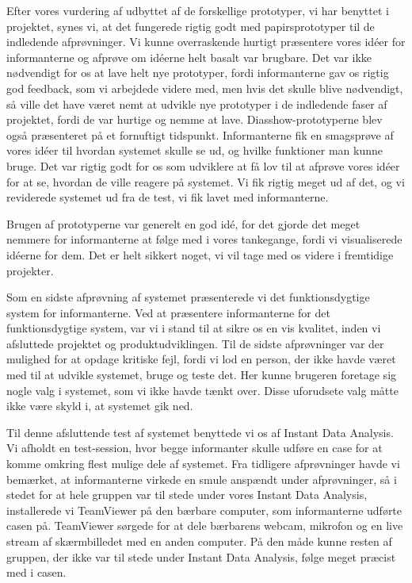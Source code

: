 Efter vores vurdering af udbyttet af de forskellige prototyper, vi har benyttet i projektet, synes vi, at det fungerede rigtig godt med papirsprototyper til de indledende afprøvninger. Vi kunne overraskende hurtigt præsentere vores idéer for informanterne og afprøve om idéerne helt basalt var brugbare. Det var ikke nødvendigt for os at lave helt nye prototyper, fordi informanterne gav os rigtig god feedback, som vi arbejdede videre med, men hvis det skulle blive nødvendigt, så ville det have været nemt at udvikle nye prototyper i de indledende faser af projektet, fordi de var hurtige og nemme at lave. Diasshow-prototyperne blev også præsenteret på et fornuftigt tidspunkt. Informanterne fik en smagsprøve af vores idéer til hvordan systemet skulle se ud, og hvilke funktioner man kunne bruge. Det var rigtig godt for os som udviklere at få lov til at afprøve vores idéer for at se, hvordan de ville reagere på systemet. Vi fik rigtig meget ud af det, og vi reviderede systemet ud fra de test, vi fik lavet med informanterne.

Brugen af prototyperne var generelt en god idé, for det gjorde det meget nemmere for informanterne at følge med i vores tankegange, fordi vi visualiserede idéerne for dem. Det er helt sikkert noget, vi vil tage med os videre i fremtidige projekter.

Som en sidste afprøvning af systemet præsenterede vi det funktionsdygtige system for informanterne. Ved at præsentere informanterne for det funktionsdygtige system, var vi i stand til at sikre os en vis kvalitet, inden vi afsluttede projektet og produktudviklingen. Til de sidste afprøvninger var der mulighed for at opdage kritiske fejl, fordi vi lod en person, der ikke havde været med til at udvikle systemet, bruge og teste det. Her kunne brugeren foretage sig nogle valg i systemet, som vi ikke havde tænkt over. Disse uforudsete valg måtte ikke være skyld i, at systemet gik ned. 

Til denne afsluttende test af systemet benyttede vi os af Instant Data Analysis. Vi afholdt en test-session, hvor begge informanter skulle udføre en case for at komme omkring flest mulige dele af systemet. Fra tidligere afprøvninger havde vi bemærket, at informanterne virkede en smule anspændt under afprøvninger, så i stedet for at hele gruppen var til stede under vores Instant Data Analysis, installerede vi TeamViewer på den bærbare computer, som informanterne udførte casen på. TeamViewer sørgede for at dele bærbarens webcam, mikrofon og en live stream af skærmbilledet med en anden computer. På den måde kunne resten af gruppen, der ikke var til stede under Instant Data Analysis, følge meget præcist med i casen.


